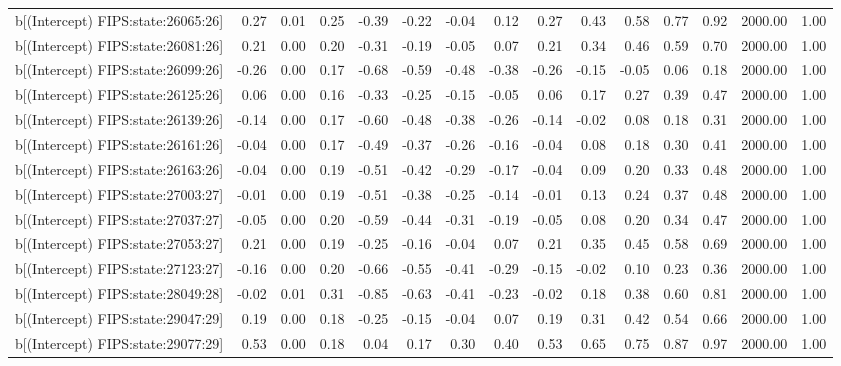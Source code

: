\begin{table}[ht]
\begin{tabular}{rrrrrrrrrrrrrrr}
  b[(Intercept) FIPS:state:26065:26] & 0.27 & 0.01 & 0.25 & -0.39 & -0.22 & -0.04 & 0.12 & 0.27 & 0.43 & 0.58 & 0.77 & 0.92 & 2000.00 & 1.00 \\ 
  b[(Intercept) FIPS:state:26081:26] & 0.21 & 0.00 & 0.20 & -0.31 & -0.19 & -0.05 & 0.07 & 0.21 & 0.34 & 0.46 & 0.59 & 0.70 & 2000.00 & 1.00 \\ 
  b[(Intercept) FIPS:state:26099:26] & -0.26 & 0.00 & 0.17 & -0.68 & -0.59 & -0.48 & -0.38 & -0.26 & -0.15 & -0.05 & 0.06 & 0.18 & 2000.00 & 1.00 \\ 
  b[(Intercept) FIPS:state:26125:26] & 0.06 & 0.00 & 0.16 & -0.33 & -0.25 & -0.15 & -0.05 & 0.06 & 0.17 & 0.27 & 0.39 & 0.47 & 2000.00 & 1.00 \\ 
  b[(Intercept) FIPS:state:26139:26] & -0.14 & 0.00 & 0.17 & -0.60 & -0.48 & -0.38 & -0.26 & -0.14 & -0.02 & 0.08 & 0.18 & 0.31 & 2000.00 & 1.00 \\ 
  b[(Intercept) FIPS:state:26161:26] & -0.04 & 0.00 & 0.17 & -0.49 & -0.37 & -0.26 & -0.16 & -0.04 & 0.08 & 0.18 & 0.30 & 0.41 & 2000.00 & 1.00 \\ 
  b[(Intercept) FIPS:state:26163:26] & -0.04 & 0.00 & 0.19 & -0.51 & -0.42 & -0.29 & -0.17 & -0.04 & 0.09 & 0.20 & 0.33 & 0.48 & 2000.00 & 1.00 \\ 
  b[(Intercept) FIPS:state:27003:27] & -0.01 & 0.00 & 0.19 & -0.51 & -0.38 & -0.25 & -0.14 & -0.01 & 0.13 & 0.24 & 0.37 & 0.48 & 2000.00 & 1.00 \\ 
  b[(Intercept) FIPS:state:27037:27] & -0.05 & 0.00 & 0.20 & -0.59 & -0.44 & -0.31 & -0.19 & -0.05 & 0.08 & 0.20 & 0.34 & 0.47 & 2000.00 & 1.00 \\ 
  b[(Intercept) FIPS:state:27053:27] & 0.21 & 0.00 & 0.19 & -0.25 & -0.16 & -0.04 & 0.07 & 0.21 & 0.35 & 0.45 & 0.58 & 0.69 & 2000.00 & 1.00 \\ 
  b[(Intercept) FIPS:state:27123:27] & -0.16 & 0.00 & 0.20 & -0.66 & -0.55 & -0.41 & -0.29 & -0.15 & -0.02 & 0.10 & 0.23 & 0.36 & 2000.00 & 1.00 \\ 
  b[(Intercept) FIPS:state:28049:28] & -0.02 & 0.01 & 0.31 & -0.85 & -0.63 & -0.41 & -0.23 & -0.02 & 0.18 & 0.38 & 0.60 & 0.81 & 2000.00 & 1.00 \\ 
  b[(Intercept) FIPS:state:29047:29] & 0.19 & 0.00 & 0.18 & -0.25 & -0.15 & -0.04 & 0.07 & 0.19 & 0.31 & 0.42 & 0.54 & 0.66 & 2000.00 & 1.00 \\ 
  b[(Intercept) FIPS:state:29077:29] & 0.53 & 0.00 & 0.18 & 0.04 & 0.17 & 0.30 & 0.40 & 0.53 & 0.65 & 0.75 & 0.87 & 0.97 & 2000.00 & 1.00 \\ 

\end{tabular}
\end{table}
